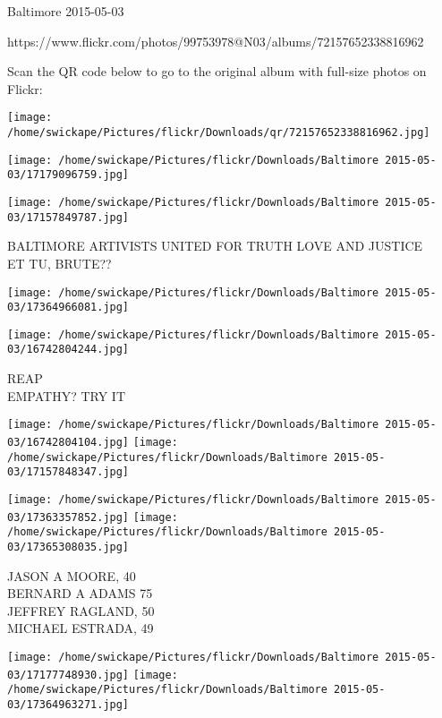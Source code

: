 \documentclass[10pt,letterpaper]{article}
\begin{document}
Baltimore 2015-05-03

https://www.flickr.com/photos/99753978@N03/albums/72157652338816962

Scan the QR code below to go to the original album with full-size photos on Flickr:

\texttt{[image: /home/swickape/Pictures/flickr/Downloads/qr/72157652338816962.jpg]}
\pagebreak

\texttt{[image: /home/swickape/Pictures/flickr/Downloads/Baltimore 2015-05-03/17179096759.jpg]}

\vspace{0.25in}
\texttt{[image: /home/swickape/Pictures/flickr/Downloads/Baltimore 2015-05-03/17157849787.jpg]}

BALTIMORE ARTIVISTS UNITED FOR TRUTH LOVE AND JUSTICE\\
ET TU, BRUTE??\\
\pagebreak

\texttt{[image: /home/swickape/Pictures/flickr/Downloads/Baltimore 2015-05-03/17364966081.jpg]}

\vspace{0.25in}
\texttt{[image: /home/swickape/Pictures/flickr/Downloads/Baltimore 2015-05-03/16742804244.jpg]}

REAP\\
EMPATHY?  TRY IT\\
\pagebreak

\texttt{[image: /home/swickape/Pictures/flickr/Downloads/Baltimore 2015-05-03/16742804104.jpg]}
\texttt{[image: /home/swickape/Pictures/flickr/Downloads/Baltimore 2015-05-03/17157848347.jpg]}

\texttt{[image: /home/swickape/Pictures/flickr/Downloads/Baltimore 2015-05-03/17363357852.jpg]}
\texttt{[image: /home/swickape/Pictures/flickr/Downloads/Baltimore 2015-05-03/17365308035.jpg]}

JASON A MOORE, 40\\
BERNARD A ADAMS 75\\
JEFFREY RAGLAND, 50\\
MICHAEL ESTRADA, 49\\
\pagebreak

\texttt{[image: /home/swickape/Pictures/flickr/Downloads/Baltimore 2015-05-03/17177748930.jpg]}
\texttt{[image: /home/swickape/Pictures/flickr/Downloads/Baltimore 2015-05-03/17364963271.jpg]}
\end{document}
